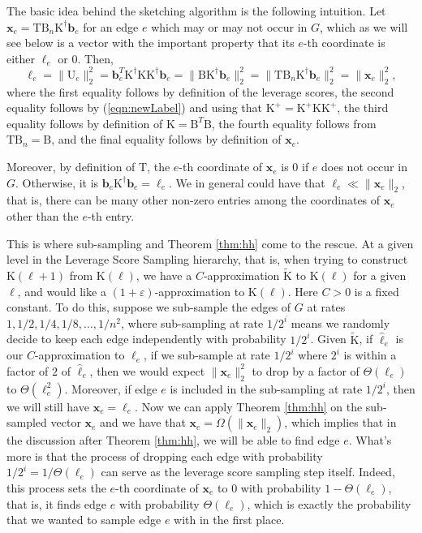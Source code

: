 \documentclass[11pt]{article}
\newcommand{\mat}[1]{{\ensuremath{\bm{\mathrm{#1}}}}}
\def\b{{\mathbf b}}
\def\matB{\mat{B}}
\def\matK{\mat{K}}
\def\matT{\mat{T}}
\def\matU{\mat{U}}
\def\x{{\mathbf x}}
\def\b{{\mathbf b}}
\newcommand{\eps}{\varepsilon}
\begin{document}
The basic idea behind the sketching algorithm is the following intuition. 
Let $\x_e = \matT \matB_n \matK^{\dagger} \b_e$ for an edge $e$ which may or may not occur in $G$, which as we will
see below is a vector with the important property that its $e$-th coordinate is either $\ell_e$ or $0$. Then, 
$$\ell_e = \|\matU_e\|_2^2 = \b_e^T \matK^{\dagger} \matK \matK^{\dagger} \b_e = \|\matB \matK^{\dagger} \b_e\|_2^2 = \|\matT \matB_n \matK^{\dagger} \b_e\|_2^2 = \|\x_e\|_2^2,$$
where the first equality follows by definition of the leverage scores, the second equality 
follows by (\ref{eqn:newLabel}) and using that $\matK^+ = \matK^+ \matK \matK^+$, the third equality
follows by definition of $\matK = \matB^T \matB$, the fourth equality follows from $\matT\matB_n = \matB$, and 
the final equality follows by definition of $\x_e$. 

Moreover, by definition of $\matT$, the $e$-th coordinate of $\x_e$ is $0$ if $e$ does not occur in $G$. 
Otherwise, it is $\b_e \matK^{\dagger} \b_e = \ell_e$. 
We in general could have that $\ell_e \ll \|\x_e\|_2$, that is, there can be many other
non-zero entries among the coordinates of $\x_e$ other than the $e$-th entry.

This is where sub-sampling and Theorem \ref{thm:hh} come to the rescue. 
At a given level in the Leverage Score Sampling hierarchy, that is, when trying to construct $\matK(\ell+1)$ from
$\matK(\ell)$, we have a $C$-approximation
$\tilde{\matK}$ to $\matK(\ell)$ for a given $\ell$, and would like a $(1+\eps)$-approximation to $\matK(\ell)$. Here
$C > 0$ is a fixed constant. To do this,
suppose we sub-sample the edges of $G$ at rates $1, 1/2, 1/4, 1/8, \ldots, 1/n^2$, where sub-sampling
at rate $1/2^i$ means we randomly decide to keep each edge independently with probability $1/2^i$. Given $\tilde{\matK}$,
if $\hat{\ell}_e$ is our $C$-approximation to $\ell_e$, if we sub-sample at rate $1/2^i$ where
$2^i$ is within a factor of $2$ of $\hat{\ell}_e$, then we would expect $\|\x_e\|_2^2$ to drop by a factor
of $\Theta(\ell_e)$ to $\Theta(\ell_e^2)$. Moreover, if edge $e$ is included in the sub-sampling at rate $1/2^i$,
then we will still have $\x_e = \ell_e$. Now we can apply Theorem \ref{thm:hh} on the sub-sampled vector $\x_e$
and we have that $\x_e = \Omega(\|\x_e\|_2)$, which implies that in the discussion after 
Theorem \ref{thm:hh}, we will be able to find edge $e$. 
What's more is that the process of dropping each edge with probability $1/2^i = 1/\Theta(\ell_e)$
can serve as the leverage score sampling step itself. Indeed, this process sets the $e$-th coordinate of $\x_e$
to $0$ with probability $1-\Theta(\ell_e)$, that is, it finds edge $e$ with probability $\Theta(\ell_e)$, which
is exactly the probability that we wanted to sample edge $e$ with in the first place. 
\end{document}
